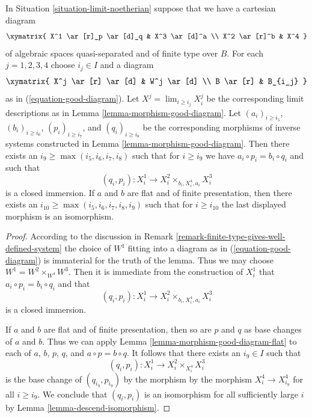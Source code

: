 \begin{lemma}
\label{lemma-good-diagram-fibre-product}
In Situation \ref{situation-limit-noetherian} suppose that we have a
cartesian diagram
$$
\xymatrix{
X^1 \ar[r]_p \ar[d]_q & X^3 \ar[d]^a \\
X^2 \ar[r]^b & X^4
}
$$
of algebraic spaces quasi-separated and of finite type over $B$.
For each $j = 1, 2, 3, 4$ choose $i_j \in I$ and a diagram
$$
\xymatrix{
X^j \ar[r] \ar[d] & W^j \ar[d] \\
B \ar[r] & B_{i_j}
}
$$
as in (\ref{equation-good-diagram}). Let
$X^j = \lim_{i \geq i_j} X^j_i$ be the corresponding limit descriptions
as in Lemma \ref{lemma-morphism-good-diagram}.
Let $(a_i)_{i \geq i_5}$, $(b_i)_{i \geq i_6}$, $(p_i)_{i \geq i_7}$, and
$(q_i)_{i \geq i_8}$ be the corresponding morphisms of inverse systems
constructed in Lemma \ref{lemma-morphism-good-diagram}. Then there exists an
$i_9 \geq \max(i_5, i_6, i_7, i_8)$ such that for $i \geq i_9$ we have
$a_i \circ p_i = b_i \circ q_i$ and such that
$$
(q_i, p_i) : X^1_i \longrightarrow X^2_i \times_{b_i, X^4_i, a_i} X^3_i
$$
is a closed immersion.
If $a$ and $b$ are flat and of finite presentation, then there exists an
$i_{10} \geq \max(i_5, i_6, i_7, i_8, i_9)$ such that for $i \geq i_{10}$
the last displayed morphism is an isomorphism.
\end{lemma}

\begin{proof}
According to the discussion in
Remark \ref{remark-finite-type-gives-well-defined-system}
the choice of $W^1$ fitting into a diagram as in
(\ref{equation-good-diagram}) is immaterial for the truth of
the lemma. Thus we may choose $W^1 = W^2 \times_{W^4} W^3$.
Then it is immediate from the construction of $X^1_i$ that 
$a_i \circ p_i = b_i \circ q_i$ and that
$$
(q_i, p_i) : X^1_i \longrightarrow X^2_i \times_{b_i, X^4_i, a_i} X^3_i
$$
is a closed immersion.

\medskip\noindent
If $a$ and $b$ are flat and of finite presentation, then so are
$p$ and $q$ as base changes of $a$ and $b$. Thus we can apply
Lemma \ref{lemma-morphism-good-diagram-flat}
to each of $a$, $b$, $p$, $q$, and $a \circ p = b \circ q$.
It follows that there exists an $i_9 \in I$ such that
$$
(q_i, p_i) : X^1_i \to X^2_i \times_{X^4_i} X^3_i
$$
is the base change of $(q_{i_9}, p_{i_9})$ by the morphism
by the morphism $X^4_i \to X^4_{i_9}$ for all $i \geq i_9$.
We conclude that $(q_i, p_i)$ is an isomorphism for all sufficiently
large $i$ by Lemma \ref{lemma-descend-isomorphism}.
\end{proof}




















